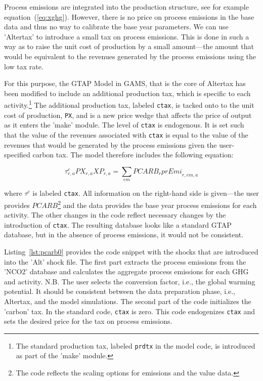 Process emissions are integrated into the production structure,
see for example equation~(\ref{eq:xghg}). However, there is no
price on process emissions in the base data and thus no way
to calibrate the base year parameters. We can use 'Altertax'
to introduce a small tax on process emissions. This is done
in such a way as to raise the unit cost of production
by a small amount---the amount that would be equivalent to the
revenues generated by the process emissions using the low tax
rate.

For this purpose, the GTAP Model in GAMS, that is the core of Altertax
has been modified to include an additional production tax, which
is specific to each activity.\footnote{The standard production tax,
labeled \texttt{prdtx} in the model code, is introduced as
part of the 'make' module.} The additional production
tax, labeled \texttt{ctax}, is tacked onto to the
unit cost of production, \texttt{PX}, and is a
new price wedge that affects the price of output as
it enters the 'make' module. The level of \texttt{ctax}
is endogenous. It is set such that the value
of the revenues associated with \texttt{ctax}
is equal to the value of the revenues that
would be generated by the process emissions given
the user-specified carbon tax. The model therefore
includes the following equation:

\[
\tau^c_{r,a}\mathit{PX}_{r,a}\mathit{XP}_{r,a}
=\displaystyle \sum_{\mathit{em}} {\mathit{PCARB}_r \mathit{prEmi}_{r,\mathit{em},a}}
\]

\noindent where $\tau^c$ is labeled \texttt{ctax}. All
information on the right-hand side is given---the user
provides $\mathit{PCARB}$\footnote{The code reflects
the scaling options for emissions and the value data.} and the data provides
the base year process emissions for each activity. The
other changes in the code reflect necessary changes by
the introduction of \texttt{ctax}. The resulting database
looks like a standard GTAP database, but in the absence
of process emissions, it would not be consistent.

Listing~\ref{lst:pcarb0} provides the code snippet with the shocks that
are introduced into the 'Alt' shock file. The first part
extracts the process emissions from the 'NCO2' database
and calculates the aggregate process emissions for each
GHG and activity. N.B. The user selects the conversion factor, i.e., the
global warming potential. It should be consistent between
the data preparation phase, i.e., Altertax, and the
model simulations. The second part of the code
initializes the 'carbon' tax. In the standard code,
\texttt{ctax} is zero. This code endogenizes \texttt{ctax}
and sets the desired price for the tax on process emissions.

